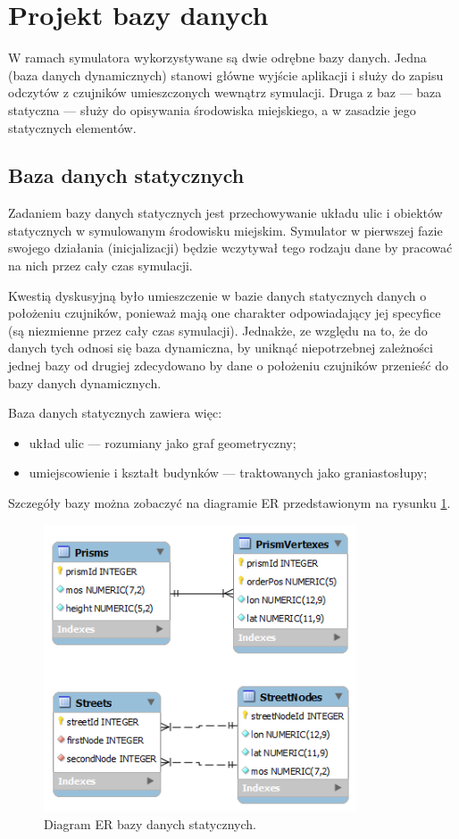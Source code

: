 {\section[Projekt bazy danych][Projekt bazy danych]{Projekt bazy danych}
\par{
W ramach symulatora wykorzystywane są dwie odrębne bazy danych. Jedna (baza danych dynamicznych) stanowi główne wyjście aplikacji i służy do zapisu odczytów z czujników umieszczonych wewnątrz symulacji. Druga z baz --- baza statyczna --- służy do opisywania środowiska miejskiego, a w zasadzie jego statycznych elementów.
}

\subsection{Baza danych statycznych}
\par{
Zadaniem bazy danych statycznych jest przechowywanie układu ulic i obiektów statycznych w symulowanym środowisku miejskim. Symulator w pierwszej fazie swojego działania (inicjalizacji) będzie wczytywał tego rodzaju dane by pracować na nich przez cały czas symulacji.
}
\par{
Kwestią dyskusyjną było umieszczenie w bazie danych statycznych danych o położeniu czujników, ponieważ mają one charakter odpowiadający jej specyfice (są niezmienne przez cały czas symulacji). Jednakże, ze względu na to, że do danych tych odnosi się baza dynamiczna, by uniknąć niepotrzebnej zależności jednej bazy od drugiej zdecydowano by dane o położeniu czujników przenieść do bazy danych dynamicznych.
}
\par{
Baza danych statycznych zawiera więc:
\begin{itemize}
\item układ ulic --- rozumiany jako graf geometryczny;
\item umiejscowienie i kształt budynków --- traktowanych jako graniastosłupy;
\end{itemize}
Szczegóły bazy można zobaczyć na diagramie ER przedstawionym na rysunku \ref{static_db}.
}
\begin{figure}[htb]
    \begin{center}
	\includegraphics[width=25em]{img/static_db}
	\caption{Diagram ER bazy danych statycznych.}
	\label{static_db}
    \end{center}
\end{figure}

}

